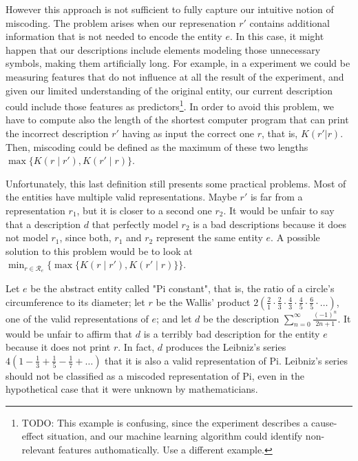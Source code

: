 However this approach is not sufficient to fully capture our intuitive notion of miscoding. The problem arises when our represenation $r'$ contains additional information that is not needed to encode the entity $e$. In this case, it might happen that our descriptions include elements modeling those unnecessary symbols, making them artificially long. For example, in a experiment we could be measuring features that do not influence at all the result of the experiment, and given our limited understanding of the original entity, our current description could include those features as predictors\footnote{\color{red} TODO: This example is confusing, since the experiment describes a cause-effect situation, and our machine learning algorithm could identify non-relevant features authomatically. Use a different example.}. In order to avoid this problem, we have to compute also the length of the shortest computer program that can print the incorrect description $r'$ having as input the correct one $r$, that is, $K(r'|r)$. Then, miscoding could be defined as the maximum of these two lengths $\max\{ K(r \mid r'), K(r' \mid r)\}$.

Unfortunately, this last definition still presents some practical problems. Most of the entities have multiple valid representations. Maybe $r'$ is far from a representation $r_1$, but it is closer to a second one $r_2$. It would be unfair to say that a description $d$ that perfectly model $r_2$ is a bad descriptions because it does not model $r_1$, since both, $r_1$ and $r_2$ represent the same entity $e$. A possible solution to this problem would be to look at $\min_{r \in \mathcal{R}_e} \{ \max\{ K(r \mid r'), K(r' \mid r)\} \}$.

\begin{example}
\label{ex:leibnez-wallis}
Let $e$ be the abstract entity called "Pi constant", that is, the ratio of a circle's circumference to its diameter; let $r$ be the Wallis' product $2 (\frac{2}{1} \cdot \frac{2}{3} \cdot \frac{4}{3} \cdot \frac{4}{5} \cdot \frac{6}{5} \cdot \ldots)$, one of the valid representations of $e$; and let $d$ be the description $\sum_{n=0}^\infty \frac{(-1)^n}{2n+1}$. It would be unfair to affirm that $d$ is a terribly bad description for the entity $e$ because it does not print $r$. In fact, $d$ produces the Leibniz's series $4 (1 - \frac{1}{3} + \frac{1}{5} - \frac{1}{7} + \ldots)$ that it is also a valid representation of Pi. Leibniz's series should not be classified as a miscoded representation of Pi, even in the hypothetical case that it were unknown by mathematicians.
\end{example}

